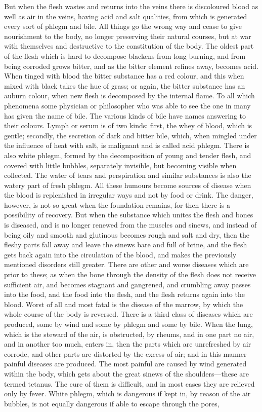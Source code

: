 \documentclass[11pt,letter]{article}
\begin{document}
\par  But when the flesh wastes and returns into the veins there is discoloured blood as well as air in the veins, having acid and salt qualities, from which is generated every sort of phlegm and bile. All things go the wrong way and cease to give nourishment to the body, no longer preserving their natural courses, but at war with themselves and destructive to the constitution of the body. The oldest part of the flesh which is hard to decompose blackens from long burning, and from being corroded grows bitter, and as the bitter element refines away, becomes acid. When tinged with blood the bitter substance has a red colour, and this when mixed with black takes the hue of grass; or again, the bitter substance has an auburn colour, when new flesh is decomposed by the internal flame. To all which phenomena some physician or philosopher who was able to see the one in many has given the name of bile. The various kinds of bile have names answering to their colours. Lymph or serum is of two kinds: first, the whey of blood, which is gentle; secondly, the secretion of dark and bitter bile, which, when mingled under the influence of heat with salt, is malignant and is called acid phlegm. There is also white phlegm, formed by the decomposition of young and tender flesh, and covered with little bubbles, separately invisible, but becoming visible when collected. The water of tears and perspiration and similar substances is also the watery part of fresh phlegm. All these humours become sources of disease when the blood is replenished in irregular ways and not by food or drink. The danger, however, is not so great when the foundation remains, for then there is a possibility of recovery. But when the substance which unites the flesh and bones is diseased, and is no longer renewed from the muscles and sinews, and instead of being oily and smooth and glutinous becomes rough and salt and dry, then the fleshy parts fall away and leave the sinews bare and full of brine, and the flesh gets back again into the circulation of the blood, and makes the previously mentioned disorders still greater. There are other and worse diseases which are prior to these; as when the bone through the density of the flesh does not receive sufficient air, and becomes stagnant and gangrened, and crumbling away passes into the food, and the food into the flesh, and the flesh returns again into the blood. Worst of all and most fatal is the disease of the marrow, by which the whole course of the body is reversed. There is a third class of diseases which are produced, some by wind and some by phlegm and some by bile. When the lung, which is the steward of the air, is obstructed, by rheums, and in one part no air, and in another too much, enters in, then the parts which are unrefreshed by air corrode, and other parts are distorted by the excess of air; and in this manner painful diseases are produced. The most painful are caused by wind generated within the body, which gets about the great sinews of the shoulders—these are termed tetanus. The cure of them is difficult, and in most cases they are relieved only by fever. White phlegm, which is dangerous if kept in, by reason of the air bubbles, is not equally dangerous if able to escape through the pores, 
\end{document}
